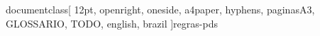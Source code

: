 documentclass[
    12pt,               %
    openright,          %
    oneside,
    a4paper,            %
    hyphens,
    paginasA3,  %
    GLOSSARIO, %
    TODO, %
    english,            %
    brazil           %
    ]{regras-pds} %



\frenchspacing 


\newpage

\pretextual


\newcommand{\todonum}[2][]
{\stepcounter{todocounter}\todo[#1]{\thetodocounter: #2}}


\listoftodos

\imprimirfolhaderosto

\renewcommand{\vhhistoryname}{Histórico de Revisões}
\renewcommand{\vhversionname}{Revisão}
\renewcommand{\vhdatename}{Data}
\renewcommand{\vhauthorname}{Autores}
\renewcommand{\vhchangename}{Descrição}

\begin{versionhistory}
\end{versionhistory}



